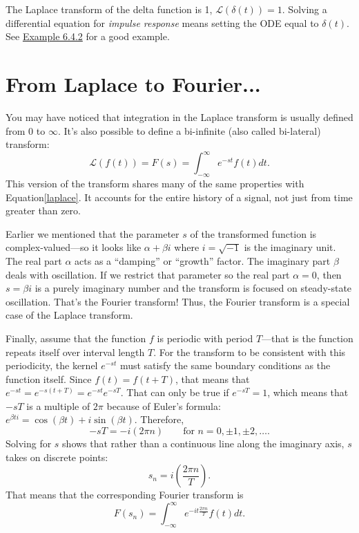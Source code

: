 \documentclass[10pt]{article}
\begin{document}
The Laplace transform of the delta function is 1, $\mathcal{L}(\delta(t)) = 1$.
Solving a differential equation for \emph{impulse response} means setting the
ODE equal to $\delta(t)$.  See
\href{https://www.jirka.org/diffyqs/html/diracdelta_section.html#diracdelta_section-5-3}{Example
6.4.2} for a good example.


\section*{From Laplace to Fourier...}

You may have noticed that integration in the Laplace transform is usually defined from 0 to $\infty$.
It's also possible to define a bi-infinite (also called bi-lateral) transform:
\begin{equation}\label{bilaplace}
\mathcal{L}(f(t)) = F(s) = \int_{-\infty}^\infty e^{-st}f(t)dt.
\end{equation}
This version of the transform shares many of the same properties with Equation\eqref{laplace}.
It accounts for the entire history of a signal, not just from time greater than zero.

Earlier we mentioned that the parameter $s$ of the transformed function is complex-valued---so
it looks like $\alpha + \beta i$ where $i=\sqrt{-1}$ is the imaginary unit.
The real part $\alpha$ acts as a ``damping'' or ``growth'' factor.
The imaginary part $\beta$ deals with oscillation.
If we restrict
that parameter so the real part $\alpha=0$, then $s=\beta i$ is a purely imaginary number
and the transform is focused on steady-state oscillation.
That's the Fourier transform! Thus, the Fourier transform is a special case of the Laplace
transform.

Finally, assume that the function $f$ is periodic with period $T$---that is the
function repeats itself over interval length $T$.  For the transform to be
consistent with this periodicity, the kernel $e^{-st}$ must satisfy the same
boundary conditions as the function itself.
Since $f(t) = f(t + T)$, that means that $e^{-st} = e^{-s(t + T)} = e^{-st}e^{-sT}$.
That can only be true if $e^{-sT} = 1$, which means that $-sT$ is a multiple of $2\pi$
because of Euler's formula:
$e^{\beta t i} = \cos(\beta t) + i\sin(\beta t).$
Therefore,
\[
-sT = -i(2\pi n)\qquad\mbox{for }n=0, \pm 1, \pm 2, \ldots.
\]
Solving for $s$ shows that rather than a continuous line along the imaginary axis, $s$ takes on
discrete points:
\[
s_n = i\left(\dfrac{2\pi n}{T}\right).
\]
That means that the corresponding Fourier transform is
\begin{equation}\label{cfourier}
F(s_n) = \int_{-\infty}^\infty e^{-it\frac{2\pi n}{T}}f(t)dt.
\end{equation}
\end{document}
